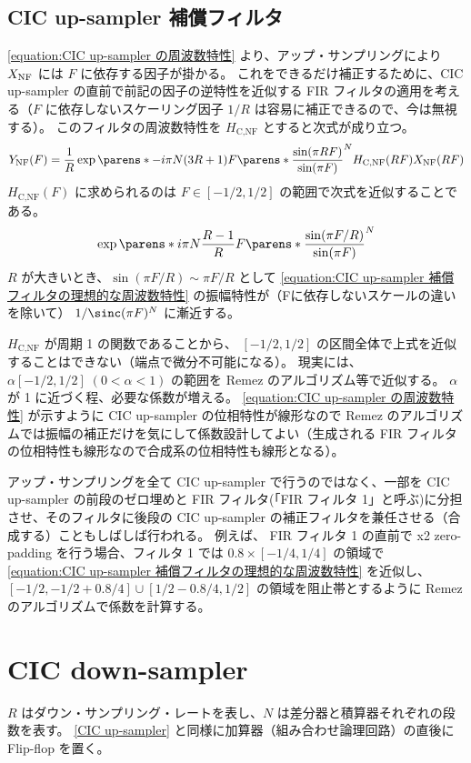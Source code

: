     \subsection{CIC up-sampler 補償フィルタ}
        \newcommand{\HCNF}{H_\text{C,NF}}

        \cref{equation:CIC up-sampler の周波数特性} より、アップ・サンプリングにより $X_\text{NF}$ には $F$ に依存する因子が掛かる。
        これをできるだけ補正するために、CIC up-sampler の直前で前記の因子の逆特性を近似する FIR フィルタの適用を考える（$F$ に依存しないスケーリング因子 $1/R$ は容易に補正できるので、今は無視する）。
        このフィルタの周波数特性を $\HCNF$ とすると次式が成り立つ。
        \[ \YNF(F) = \frac{1}{R}\exp\parens*{-i\pi N(3R+1)F}\parens*{\frac{\sin(\pi R F)}{\sin(\pi F)}}^N \HCNF(R F)\XNF(R F) \]
        $\HCNF(F)$ に求められるのは $F \in [-1/2,1/2]$ の範囲で次式を近似することである。
        \begin{equation}
            \exp\parens*{i\pi N\frac{R-1}{R}F}\parens*{\frac{\sin(\pi F/R)}{\sin(\pi F)}}^N \label{equation:CIC up-sampler 補償フィルタの理想的な周波数特性}
        \end{equation}
        $R$ が大きいとき、$\sin(\pi F/R) \sim \pi F/R$ として \cref{equation:CIC up-sampler 補償フィルタの理想的な周波数特性} の振幅特性が（Fに依存しないスケールの違いを除いて） $1/\sinc(\pi F)^N$ に漸近する。
        \par
        $\HCNF$ が周期 1 の関数であることから、 $[-1/2,1/2]$ の区間全体で上式を近似することはできない（端点で微分不可能になる）。
        現実には、$\alpha[-1/2,1/2]\;(0<\alpha<1)$ の範囲を Remez のアルゴリズム等で近似する。
        $\alpha$ が 1 に近づく程、必要な係数が増える。
        \cref{equation:CIC up-sampler の周波数特性} が示すように CIC up-sampler の位相特性が線形なので Remez のアルゴリズムでは振幅の補正だけを気にして係数設計してよい（生成される FIR フィルタの位相特性も線形なので合成系の位相特性も線形となる）。
        \par
        アップ・サンプリングを全て CIC up-sampler で行うのではなく、一部を CIC up-sampler の前段のゼロ埋めと FIR フィルタ(「FIR フィルタ 1」と呼ぶ)に分担させ、そのフィルタに後段の CIC up-sampler の補正フィルタを兼任させる（合成する）こともしばしば行われる。
        例えば、 FIR フィルタ 1 の直前で x2 zero-padding を行う場合、フィルタ 1 では $0.8\times[-1/4,1/4]$ の領域で \cref{equation:CIC up-sampler 補償フィルタの理想的な周波数特性} を近似し、$[-1/2,-1/2+0.8/4]\cup[1/2-0.8/4,1/2]$ の領域を阻止帯とするように Remez のアルゴリズムで係数を計算する。
\section{CIC down-sampler}
    $R$ はダウン・サンプリング・レートを表し、$N$ は差分器と積算器それぞれの段数を表す。
    \ref{CIC up-sampler} と同様に加算器（組み合わせ論理回路）の直後に Flip-flop を置く。
